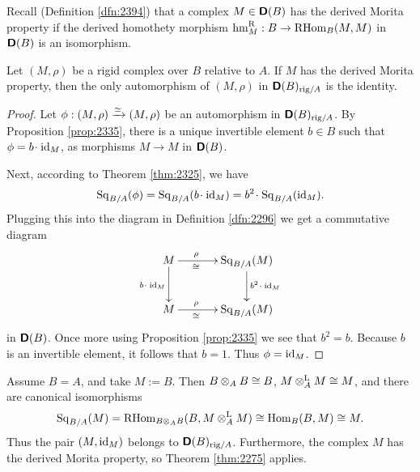 Recall (Definition \ref{dfn:2394}) that a complex $M \in \boldsymbol{\mathsf{D}}(B)$ 
has the derived Morita property 
if the derived homothety morphism 
$\operatorname{hm}^{\mathrm{R}}_{M} : B \to \operatorname{RHom}_B(M, M)$
in $\boldsymbol{\mathsf{D}}(B)$ is an isomorphism. 

\begin{thm} \label{thm:2275}
Let $(M, \rho)$ be a rigid complex over $B$ relative to $A$. If $M$ has the 
derived Morita property, then the only automorphism of 
$(M, \rho)$ in $\boldsymbol{\mathsf{D}}(B)_{\mathrm{rig} / A}$ is the identity. 
\end{thm}

\begin{proof}
Let 
$\phi : (M, \rho) \xrightarrow{\simeq} (M, \rho)$
be an automorphism in $\boldsymbol{\mathsf{D}}(B)_{\mathrm{rig} / A}$.
By Proposition \ref{prop:2335}, there is a unique invertible element $b \in B$ 
such that $\phi = b \mspace{1.5mu}{\cdot}\mspace{1.5mu} \operatorname{id}_M$, as morphisms $M \to M$ in 
$\boldsymbol{\mathsf{D}}(B)$. 

Next, according to Theorem \ref{thm:2325}, we have 
\[ \operatorname{Sq}_{B / A}(\phi) = \operatorname{Sq}_{B / A}(b \mspace{1.5mu}{\cdot}\mspace{1.5mu} \operatorname{id}_M) = 
b^2 \mspace{1.5mu}{\cdot}\mspace{1.5mu} \operatorname{Sq}_{B / A}(\operatorname{id}_M) . \]
Plugging this into the diagram in Definition \ref{dfn:2296} we get a 
commutative diagram 
\[ \UseTips \xymatrix @C=8ex @R=6ex {
M
\ar[r]^(0.35){\rho}_(0.35){\cong}
\ar[d]_{b \cd \opn{id}_M}
&
\opn{Sq}_{B / A}(M)
\ar[d]^{b^2 \cd \opn{id}_M}
\\
M
\ar[r]^(0.35){\rho}_(0.35){\cong}
&
\opn{Sq}_{B / A}(M)
} \]
in $\boldsymbol{\mathsf{D}}(B)$. 
Once more using Proposition \ref{prop:2335} we see that $b^2 = b$. 
Because $b$ is an invertible element, it follows that $b = 1$. Thus 
$\phi = \operatorname{id}_M$. 
\end{proof}

\begin{exa} \label{exa:2275}
Assume $B = A$, and take $M := B$. Then $B \otimes_{A} B \cong B$, 
$M \otimes^{\mathrm{L}}_A M \cong M$, and there are canonical isomorphisms
\[ \operatorname{Sq}_{B / A}(M) = \operatorname{RHom}_{B \otimes_{A} B}(B, M \otimes^{\mathrm{L}}_A M) \cong 
\operatorname{Hom}_{B}(B, M) \cong M . \]
Thus the pair $(M, \operatorname{id}_M)$ belongs to $\boldsymbol{\mathsf{D}}(B)_{\mathrm{rig} / A}$.
Furthermore, the complex $M$ has the derived Morita property, so Theorem 
\ref{thm:2275} applies. 
\end{exa}

